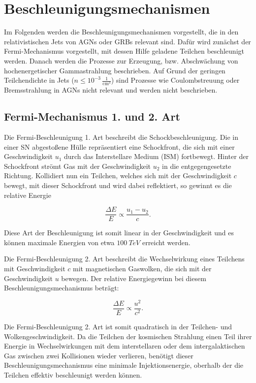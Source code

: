 \section{Beschleunigungsmechanismen} 
\label{sec:Beschleunigungsmechanismen}
Im Folgenden werden die Beschleunigungsmechanismen vorgestellt, die in den relativistischen Jets von AGNs oder GRBs relevant sind.
Dafür wird zunächst der Fermi-Mechanismus vorgestellt, mit dessen Hilfe geladene Teilchen beschleunigt werden.
Danach werden die Prozesse zur Erzeugung, bzw. Abschwächung von hochenergetischer Gammastrahlung beschrieben.
Auf Grund der geringen Teilchendichte in Jets ($n\leq 10^{-3}\,\frac{1}{\text{cm}^3}$) \cite{RelativisticJets} sind Prozesse wie Coulombstreuung oder Bremsstrahlung in AGNs nicht relevant und werden nicht beschrieben.

\subsection{Fermi-Mechanismus 1. und 2. Art}
Die Fermi-Beschleunigung 1. Art beschreibt die Schockbeschleunigung.
Die in einer SN abgestoßene Hülle repräsentiert eine Schockfront, die sich mit einer Geschwindigkeit $u_1$ durch das Interstellare Medium (ISM) fortbewegt. 
Hinter der Schockfront strömt Gas mit der Geschwindigkeit $u_2$ in die entgegengesetzte Richtung.
Kollidiert nun ein Teilchen, welches sich mit der Geschwindigkeit $c$ bewegt, mit dieser Schockfront und wird dabei reflektiert, so gewinnt es die relative Energie

\begin{equation}
 \frac{\Delta E}{E}\propto \frac{u_1-u_2}{c}.
\end{equation}

Diese Art der Beschleunigung ist somit linear in der Geschwindigkeit und es können maximale Energien von etwa $\SI{100}{TeV}$ erreicht werden.\cite{Grupen}\cite{Longair}

Die Fermi-Beschleunigung 2. Art beschreibt die Wechselwirkung eines Teilchens mit Geschwindigkeit $c$ mit magnetischen Gaswolken, die sich mit der Geschwindigkeit $u$ bewegen.
Der relative Energiegewinn bei diesem Beschleunigungsmechanismus beträgt:

\begin{equation}
 \frac{\Delta E}{E}\propto \frac{u^2}{c^2}.
\end{equation}

Die Fermi-Beschleunigung 2. Art ist somit quadratisch in der Teilchen- und Wolkengeschwindigkeit.
Da die Teilchen der kosmischen Strahlung einen Teil ihrer Energie in Wechselwirkungen mit dem interstellaren oder dem intergalaktischen Gas zwischen zwei Kollisionen wieder verlieren, benötigt dieser Beschleunigungsmechanismus eine minimale Injektionsenergie, oberhalb der die Teilchen effektiv beschleunigt werden können.\cite{Grupen}\cite{Longair}



